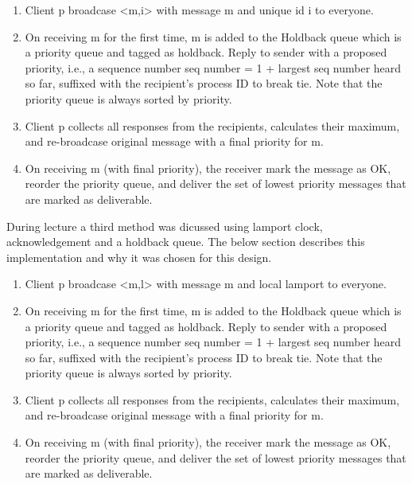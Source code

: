 \begin{enumerate}
\item Client p broadcase  <m,i>  with message m and unique id i to everyone.
 
\item On receiving m for the first time, m is added to the Holdback queue which is a priority queue and tagged as holdback. Reply to sender with a proposed priority, i.e., a sequence number seq number = 1 + largest seq number heard so far, suffixed with the recipient’s process ID to break tie. Note that the priority queue is always sorted by priority.

\item Client p collects all responses from the recipients, calculates their maximum, and re-broadcase original message with a final priority for m. 

\item On receiving m (with final priority), the receiver mark the message as OK, reorder the priority queue, and deliver the set of lowest priority messages that are marked as deliverable.
\end{enumerate}

During lecture a third method was dicussed using lamport clock, acknowledgement and a holdback queue. The below section describes this implementation and why it was chosen for this design.

\begin{enumerate}
\item Client p broadcase  <m,l>  with message m and local lamport to everyone.
 
\item On receiving m for the first time, m is added to the Holdback queue which is a priority queue and tagged as holdback. Reply to sender with a proposed priority, i.e., a sequence number seq number = 1 + largest seq number heard so far, suffixed with the recipient’s process ID to break tie. Note that the priority queue is always sorted by priority.

\item Client p collects all responses from the recipients, calculates their maximum, and 
re-broadcase original message with a final priority for m. 

\item On receiving m (with final priority), the receiver mark the message as OK, reorder the priority queue, and deliver the set of lowest priority messages that are marked as deliverable.
\end{enumerate}
